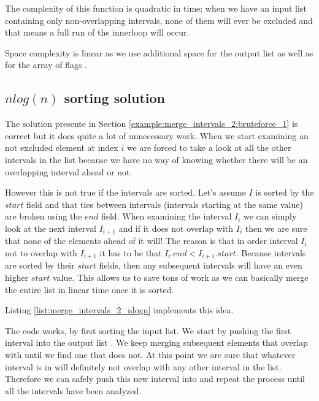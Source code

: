 The complexity of this function is quadratic in time; when we have an input list containing only non-overlapping intervals, none of them will ever be excluded and that means a full run of the innerloop will occur.

Space complexity is linear as we use additional space for the output list as well as for the array of flags . 

\subsection{$nlog(n)$ sorting solution}
\label{example:merge_intervals_2:sorting_1}
The solution presente in Section \ref{example:merge_intervals_2:bruteforce_1} is correct but it does quite a lot of unnecessary work. When we start examining an not excluded element at index $i$ we are forced to take a look at all the other intervals in the list because we have no way of knowing whether there will be an overlapping interval ahead or not.

However this is not true if the intervals are sorted. Let's assume $I$ is sorted by the $start$ field and that ties between intervals (intervals starting at the same value) are broken using the $end$ field.
When examining the interval $I_i$ we can simply look at the next interval $I_{i+1}$ and if it does not overlap with $I_i$ then we are sure that none of the elements ahead of it will! The reason is that in order interval $I_i$ not to overlap with $I_{i+1}$ it has to be that $I_i.end < I_{i+1}.start$. Because intervals are sorted by their $start$ fields, then any subsequent intervals will have an even higher $start$ value. 
This allows us to save tons of work as we can basically merge the entire list in linear time once it is sorted. 

Listing \ref{list:merge_intervals_2_nlogn} implements this idea.



The code works, by first sorting the input list. We  start by pushing the first interval into the output list . We keep merging subsequent elements that overlap with  until we find one that does not. At this point we are sure that whatever interval is in  will definitely not overlap with any other interval in the list. Therefore we can safely push this new interval into  and repeat the process until all the intervals have been analyzed.

